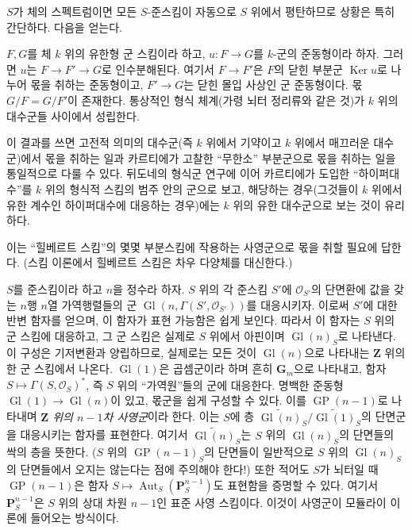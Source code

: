 $S$가 체의 스펙트럼이면 모든 $S$-준스킴이 자동으로 $S$ 위에서
평탄하므로 상황은 특히 간단하다. 다음을 얻는다.

 $F,G$를 체 $k$ 위의 유한형 군 스킴이라 하고,
$u:F\to G$를 $k$-군의 준동형이라 하자. 그러면 $u$는
$F\to F'\to G$로 인수분해된다. 여기서 $F\to F'$은 $F$의 닫힌 부분군
$\operatorname{Ker}u$로 나누어 몫을 취하는 준동형이고, $F'\to G$는
닫힌 몰입 사상인 군 준동형이다. 몫 $G/F=G/F'$이 존재한다. 통상적인
형식 체계(가령 뇌터 정리류와 같은 것)가 $k$ 위의 대수군들 사이에서
성립한다.

이 결과를 쓰면 고전적 의미의 대수군(즉 $k$ 위에서 기약이고 $k$ 위에서
매끄러운 대수군)에서 몫을 취하는 일과 카르티에가 고찰한 ``무한소''
부분군으로 몫을 취하는 일을 통일적으로 다룰 수 있다.
뒤도네의 형식군 연구에 이어 카르티에가 도입한 ``하이퍼대수''를 $k$ 위의
형식적 스킴의 범주 안의 군으로 보고, 해당하는 경우(그것들이 $k$ 위에서
유한 계수인 하이퍼대수에 대응하는 경우)에는 $k$ 위의 유한 대수군으로
보는 것이 유리하다.


이는 ``힐베르트 스킴''의 몇몇 부분스킴에 작용하는 사영군으로 몫을
취할 필요에 답한다. (스킴 이론에서 힐베르트 스킴은 차우 다양체를
대신한다.)

$S$를 준스킴이라 하고 $n$을 정수라 하자. $S$ 위의 각 준스킴 $S'$에
$\mathcal O_{S'}$의 단면환에 값을 갖는 $n$행 $n$열 가역행렬들의 군
$\operatorname{Gl}(n,\Gamma(S',\mathcal O_{S'}))$를 대응시키자. 이로써
$S'$에 대한 반변 함자를 얻으며, 이 함자가 표현 가능함은 쉽게 보인다.
따라서 이 함자는 $S$ 위의 군 스킴에 대응하고, 그 군 스킴은 실제로
$S$ 위에서 아핀이며 $\operatorname{Gl}(n)_S$로 나타낸다. 이 구성은
기저변환과 양립하므로, 실제로는 모든 것이 $\operatorname{Gl}(n)$으로
나타내는 $\mathbf Z$ 위의 한 군 스킴에서 나온다.
$\operatorname{Gl}(1)$은 곱셈군이라 하며 흔히 $\mathbf G_m$으로 나타내고,
함자
$S\longmapsto\Gamma(S,\mathcal O_S)^*$, 즉 $S$ 위의 ``가역원''들의 군에
대응한다. 명백한 준동형
$\operatorname{Gl}(1)\to\operatorname{Gl}(n)$이 있고, 몫군을 쉽게
구성할 수 있다. 이를 $\operatorname{GP}(n-1)$로 나타내며
\emph{$\mathbf Z$ 위의 $n-1$차 사영군}이라 한다. 이는 $S$에 층
$\widetilde{\operatorname{Gl}(n)}_S/
\widetilde{\operatorname{Gl}(1)}_S$의 단면군을 대응시키는 함자를
표현한다. 여기서 $\widetilde{\operatorname{Gl}(n)}_S$는 $S$ 위의
$\operatorname{Gl}(n)_S$의 단면들의 싹의 층을 뜻한다. ($S$ 위의
$\operatorname{GP}(n-1)_S$의 단면들이 일반적으로 $S$ 위의
$\operatorname{Gl}(n)_S$의 단면들에서 오지는 않는다는 점에 주의해야
한다!) 또한 적어도 $S$가 뇌터일 때 $\operatorname{GP}(n-1)$은 함자
$S\longmapsto\operatorname{Aut}_S(\mathbf P_S^{n-1})$도 표현함을 증명할
수 있다. 여기서 $\mathbf P_S^{n-1}$은 $S$ 위의 상대 차원 $n-1$인 표준
사영 스킴이다. 이것이 사영군이 모듈라이 이론에 들어오는 방식이다.

